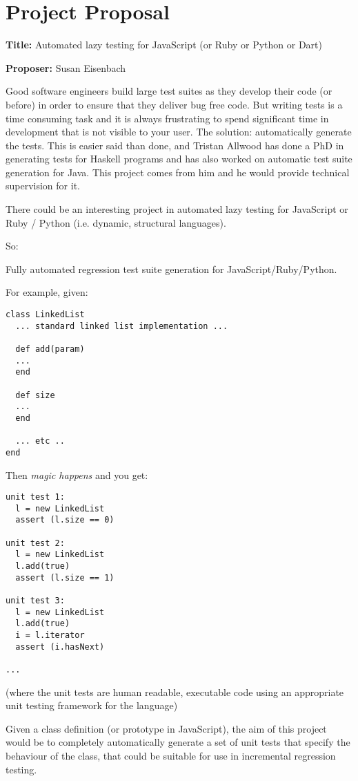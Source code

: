 \appendix
\chapter{Project Proposal}
\label{appx:proposal}
\textbf{Title:} Automated lazy testing for JavaScript (or Ruby or Python or
Dart)

\textbf{Proposer:} Susan Eisenbach

Good software engineers build large test suites as they develop their code (or before) in order to ensure that they deliver bug free code. But writing tests is a time consuming task and it is always frustrating to spend significant time in development that is not visible to your user. The solution: automatically generate the tests. This is easier said than done, and Tristan Allwood has done a PhD in generating tests for Haskell programs and has also worked on automatic test suite generation for Java. This project comes from him and he would provide technical supervision for it.

There could be an interesting project in automated lazy testing for
JavaScript or Ruby / Python (i.e. dynamic, structural languages).



So:

Fully automated regression test suite generation for
JavaScript/Ruby/Python.

For example, given:
\begin{verbatim}
class LinkedList
  ... standard linked list implementation ...

  def add(param)
  ...
  end

  def size
  ...
  end

  ... etc ..
end
\end{verbatim}

Then \emph{magic happens} and you get:

\begin{verbatim}
unit test 1:
  l = new LinkedList
  assert (l.size == 0)

unit test 2:
  l = new LinkedList
  l.add(true)
  assert (l.size == 1)

unit test 3:
  l = new LinkedList
  l.add(true)
  i = l.iterator
  assert (i.hasNext)

...
\end{verbatim}

(where the unit tests are human readable, executable code using an
appropriate unit testing framework for the language)

Given a class definition (or prototype in JavaScript), the aim of this
project would be to completely automatically generate a set of unit
tests that specify the behaviour of the class, that could be suitable
for use in incremental regression testing.

